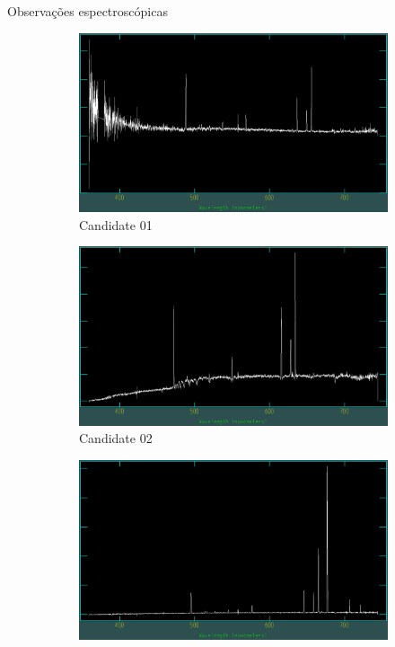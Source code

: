 \begin{frame}[c]{Observações espectroscópicas}
\vspace{0.1cm}
\begin{figure}
    \captionsetup{justification=centering}
    \centering
    \begin{subfigure}[b]{0.31\textwidth}
        \includegraphics[width=\textwidth]{images/espectros/Candidate1.png}
        \caption{Candidate 01}
    \end{subfigure}
    \begin{subfigure}[b]{0.31\textwidth}
        \includegraphics[width=\textwidth]{images/espectros/Candidate2.png}
        \caption{Candidate 02}
    \end{subfigure}
    \begin{subfigure}[b]{0.31\textwidth}
        \includegraphics[width=\textwidth]{images/espectros/Candidate3.png}

\end{subfigure}
\end{figure}
\end{frame}
